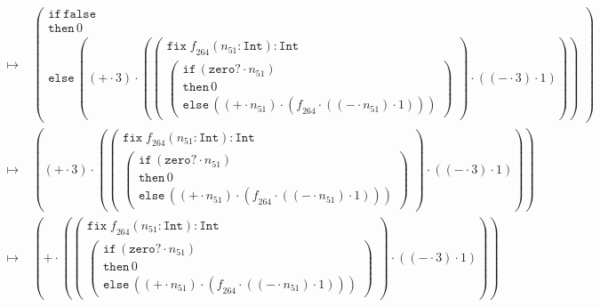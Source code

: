 \documentclass{article}
\begin{document}
\begin{align*}
\longmapsto &\;\left(\begin{array}{l}\mathtt{if}\,\mathtt{false}\\\mathtt{then}\,0\\\mathtt{else}\,\left(\left(\mathtt{+}\cdot 3\right)\cdot \left(\left(\begin{array}{l} \mathtt{fix}\; \mathit{f}_{264}(\mathit{n}_{51}:\mathtt{Int}): \mathtt{Int}\\\left(\begin{array}{l}\mathtt{if}\,\left(\mathtt{zero?}\cdot \mathit{n}_{51}\right)\\\mathtt{then}\,0\\\mathtt{else}\,\left(\left(\mathtt{+}\cdot \mathit{n}_{51}\right)\cdot \left(\mathit{f}_{264}\cdot \left(\left(\mathtt{-}\cdot \mathit{n}_{51}\right)\cdot 1\right)\right)\right)\end{array}\right)\end{array}\right)\cdot \left(\left(\mathtt{-}\cdot 3\right)\cdot 1\right)\right)\right)\end{array}\right)\\ 
\longmapsto &\;\left(\left(\mathtt{+}\cdot 3\right)\cdot \left(\left(\begin{array}{l} \mathtt{fix}\; \mathit{f}_{264}(\mathit{n}_{51}:\mathtt{Int}): \mathtt{Int}\\\left(\begin{array}{l}\mathtt{if}\,\left(\mathtt{zero?}\cdot \mathit{n}_{51}\right)\\\mathtt{then}\,0\\\mathtt{else}\,\left(\left(\mathtt{+}\cdot \mathit{n}_{51}\right)\cdot \left(\mathit{f}_{264}\cdot \left(\left(\mathtt{-}\cdot \mathit{n}_{51}\right)\cdot 1\right)\right)\right)\end{array}\right)\end{array}\right)\cdot \left(\left(\mathtt{-}\cdot 3\right)\cdot 1\right)\right)\right)\\ 
\longmapsto &\;\left(\mathtt{+}\cdot \left(\left(\begin{array}{l} \mathtt{fix}\; \mathit{f}_{264}(\mathit{n}_{51}:\mathtt{Int}): \mathtt{Int}\\\left(\begin{array}{l}\mathtt{if}\,\left(\mathtt{zero?}\cdot \mathit{n}_{51}\right)\\\mathtt{then}\,0\\\mathtt{else}\,\left(\left(\mathtt{+}\cdot \mathit{n}_{51}\right)\cdot \left(\mathit{f}_{264}\cdot \left(\left(\mathtt{-}\cdot \mathit{n}_{51}\right)\cdot 1\right)\right)\right)\end{array}\right)\end{array}\right)\cdot \left(\left(\mathtt{-}\cdot 3\right)\cdot 1\right)\right)\right)\\ 

\end{align*}
\end{document}

